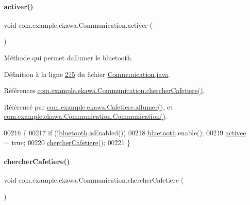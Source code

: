 \paragraph{\texorpdfstring{activer()}{activer()}}
{\footnotesize\ttfamily void com.\+example.\+ekawa.\+Communication.\+activer (\begin{DoxyParamCaption}{ }\end{DoxyParamCaption})}



Méthode qui permet d\textquotesingle{}allumer le bluetooth. 



Définition à la ligne \hyperlink{_communication_8java_source_l00215}{215} du fichier \hyperlink{_communication_8java_source}{Communication.\+java}.



Références \hyperlink{_communication_8java_source_l00276}{com.\+example.\+ekawa.\+Communication.\+chercher\+Cafetiere()}.



Référencé par \hyperlink{_cafetiere_8java_source_l00414}{com.\+example.\+ekawa.\+Cafetiere.\+allumer()}, et \hyperlink{_communication_8java_source_l00195}{com.\+example.\+ekawa.\+Communication.\+Communication()}.


\begin{DoxyCode}
00216     \{
00217         \textcolor{keywordflow}{if} (!\hyperlink{classcom_1_1example_1_1ekawa_1_1_communication_a0ed43f74b2eae7e8f150b049953da384}{bluetooth}.isEnabled())
00218             \hyperlink{classcom_1_1example_1_1ekawa_1_1_communication_a0ed43f74b2eae7e8f150b049953da384}{bluetooth}.enable();
00219         \hyperlink{classcom_1_1example_1_1ekawa_1_1_communication_a2f49177a9865ed41a759bce83658bb6e}{activee} = \textcolor{keyword}{true};
00220         \hyperlink{classcom_1_1example_1_1ekawa_1_1_communication_afc96e58f53fc167fe9fc76a229c01cb0}{chercherCafetiere}();
00221     \}
\end{DoxyCode}
\mbox{\label{classcom_1_1example_1_1ekawa_1_1_communication_afc96e58f53fc167fe9fc76a229c01cb0}} 
\paragraph{\texorpdfstring{chercher\+Cafetiere()}{chercherCafetiere()}}
{\footnotesize\ttfamily void com.\+example.\+ekawa.\+Communication.\+chercher\+Cafetiere (\begin{DoxyParamCaption}{ }\end{DoxyParamCaption})\hspace{0.3cm}{\ttfamily [private]}}



